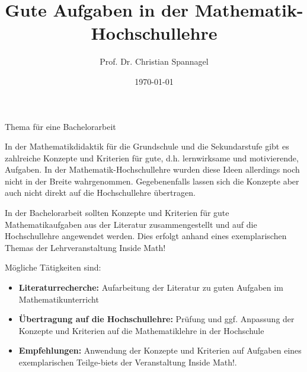 \documentclass{../cssheet}
\title{Gute Aufgaben in der Mathematik-Hochschullehre}
\author{Prof. Dr. Christian Spannagel}
\date{\today}
\begin{document}
\vspace*{5mm}
\begin{center}
{\Large Thema für eine Bachelorarbeit}
\end{center}

\printtitle
\vspace*{1cm}

In der Mathematikdidaktik für die Grundschule und die Sekundarstufe gibt es zahlreiche Konzepte und Kriterien für gute, d.h. lernwirksame und motivierende, Aufgaben. In der Mathematik-Hoch\-schul\-leh\-re wurden diese Ideen allerdings noch nicht in der Breite wahrgenommen. Gegebenenfalls lassen sich die Konzepte aber auch nicht direkt auf die Hochschullehre übertragen. 

In der Bachelorarbeit sollten Konzepte und Kriterien für gute Mathematikaufgaben aus der Literatur zusammengestellt und auf die Hochschullehre angewendet werden. Dies erfolgt anhand eines exemplarischen Themas der Lehrveranstaltung \glqq{}Inside Math!\grqq{}


Mögliche Tätigkeiten sind:
\begin{itemize}
\item \textbf{Literaturrecherche:} Aufarbeitung der Literatur zu guten Aufgaben im Mathematikunterricht
\item \textbf{Übertragung auf die Hochschullehre:} Prüfung und ggf. Anpassung der Konzepte und Kriterien auf die Mathematiklehre in der Hochschule
\item \textbf{Empfehlungen:} Anwendung der Konzepte und Kriterien auf Aufgaben eines exemplarischen Teilge-biets der Veranstaltung \glqq{}Inside Math!\grqq{}.
\end{itemize}

\vspace*{10mm}

\printlicense

\printsocials
\end{document}
